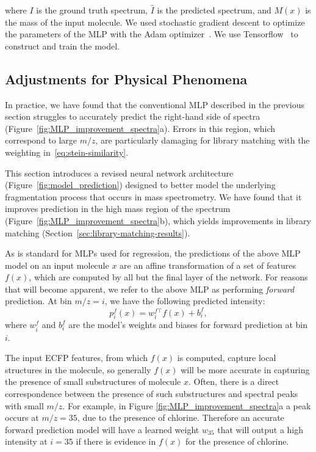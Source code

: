 where $I$ is the ground truth spectrum, $\hat{I}$ is the predicted spectrum, and $M(x)$ is the mass of the input molecule.
We used stochastic gradient descent to optimize the parameters of the MLP with the Adam optimizer~\cite{Kingma_adam_optimizer}. We use Tensorflow~\cite{Tensorflow-2016} to construct and train the model.

\subsection{Adjustments for Physical Phenomena}\label{sec:ms_physical_phenomena}

In practice, we have found that the conventional MLP described in the previous section struggles to accurately predict the right-hand side of spectra (Figure~\ref{fig:MLP_improvement_spectra}a). Errors in this region, which correspond to large $m/z$, are particularly damaging for library matching with the weighting in~\eqref{eq:stein-similarity}.

This section introduces a revised neural network architecture (Figure~\ref{fig:model_prediction}) designed to better model the underlying fragmentation process that occurs in mass spectrometry. We have found that it improves prediction in the high mass region of the spectrum (Figure~\ref{fig:MLP_improvement_spectra}b), which yields improvements in library matching (Section~\ref{sec:library-matching-results}).

As is standard for MLPs used for regression, the predictions of the above MLP model on an input molecule $x$ are an affine transformation of a set of features $f(x)$, which are computed by all but the final layer of the network. For reasons that will become apparent, we refer to the above MLP as performing \textit{forward} prediction. At bin $m/z = i$, we have the following predicted intensity:
\begin{equation}
p^f_i(x) = w^{f\top}_i f(x) + b^f_i, \label{eq:pred-i}
\end{equation}
where $w^f_i$ and $b^f_i$ are the model's weights and biases for forward prediction at bin $i$.

The input ECFP features, from which $f(x)$ is computed, capture local structures in the molecule, so generally $f(x)$ will be more accurate in capturing the presence of small substructures of molecule $x$. Often, there is a direct correspondence between the presence of such substructures and spectral peaks with small $m/z$. For example, in Figure \ref{fig:MLP_improvement_spectra}a a peak occurs at $m/z = 35$, due to the presence of chlorine. Therefore an accurate forward prediction model will have a learned weight $w_{35}$ that will output a high intensity at $i = 35$ if there is evidence in $f(x)$ for the presence of chlorine.

